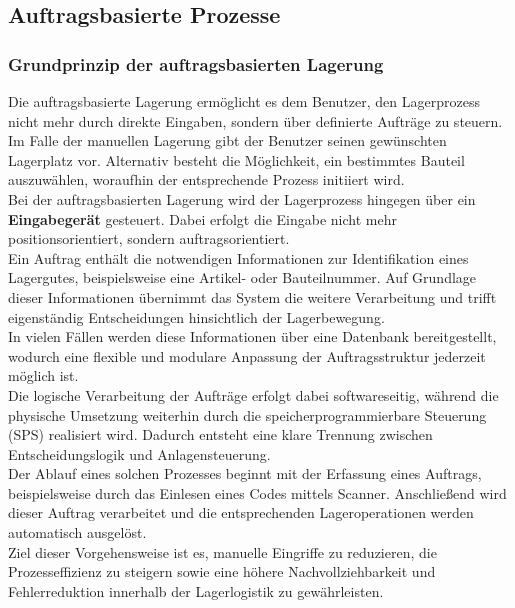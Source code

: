 \subsection{Auftragsbasierte Prozesse}
\subsubsection{Grundprinzip der auftragsbasierten Lagerung}
Die auftragsbasierte Lagerung ermöglicht es dem Benutzer, den Lagerprozess nicht mehr durch direkte Eingaben, sondern über definierte Aufträge zu steuern.\\
Im Falle der manuellen Lagerung gibt der Benutzer seinen gewünschten Lagerplatz vor. Alternativ besteht die Möglichkeit, ein bestimmtes Bauteil auszuwählen, woraufhin der entsprechende Prozess initiiert wird.\\
Bei der auftragsbasierten Lagerung wird der Lagerprozess hingegen über ein \textbf{Eingabegerät} gesteuert. Dabei erfolgt die Eingabe nicht mehr positionsorientiert, sondern auftragsorientiert.\\

Ein Auftrag enthält die notwendigen Informationen zur Identifikation eines Lagergutes, beispielsweise eine Artikel- oder Bauteilnummer. Auf Grundlage dieser Informationen übernimmt das System die weitere Verarbeitung und trifft eigenständig Entscheidungen hinsichtlich der Lagerbewegung.\\
In vielen Fällen werden diese Informationen über eine Datenbank bereitgestellt, wodurch eine flexible und modulare Anpassung der Auftragsstruktur jederzeit möglich ist.\\

Die logische Verarbeitung der Aufträge erfolgt dabei softwareseitig, während die physische Umsetzung weiterhin durch die speicherprogrammierbare Steuerung (SPS) realisiert wird. Dadurch entsteht eine klare Trennung zwischen Entscheidungslogik und Anlagensteuerung.\\

Der Ablauf eines solchen Prozesses beginnt mit der Erfassung eines Auftrags, beispielsweise durch das Einlesen eines Codes mittels Scanner. Anschließend wird dieser Auftrag verarbeitet und die entsprechenden Lageroperationen werden automatisch ausgelöst.\\

Ziel dieser Vorgehensweise ist es, manuelle Eingriffe zu reduzieren, die Prozesseffizienz zu steigern sowie eine höhere Nachvollziehbarkeit und Fehlerreduktion innerhalb der Lagerlogistik zu gewährleisten.
